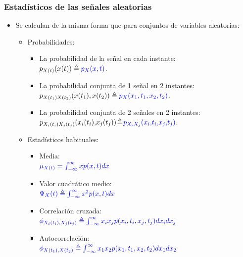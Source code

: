 \documentclass{beamer}
\numberwithin{section}{part}
\begin{document}
\begin{frame}
  \frametitle{Estadísticos de las señales aleatorias}
  \vspace{-0.2cm}
  \footnotesize
  \begin{itemize}
    \item Se calculan de la misma forma que para conjuntos de variables aleatorias:
    \begin{itemize}
      \footnotesize
      \item Probabilidades:
      \begin{itemize}
        \scriptsize
        \item La probabilidad de la señal en cada instante: \\$p_{X(t)}(x(t))\triangleq \color{blue}p_X(x,t)$.
        \item La probabilidad conjunta de 1 señal en 2 instantes:\\$p_{X(t_1)X(t_2)}(x(t_1),x(t_2))\triangleq \color{blue}p_X(x_1,t_1,x_2,t_2)$.\\
        \item La probabilidad conjunta de 2 señales en 2 instantes:\\$p_{X_i(t_i)X_j(t_j)}(x_i(t_i),\!x_j(t_j))\!\triangleq \color{blue}\! p_{X_iX_j}(x_i,\!t_i,\!x_j,\!t_j)$.
      \end{itemize}

      \item Estadísticos habituales:

      \begin{itemize}
        \scriptsize
        \item Media:\\$\color{blue}\mu_{X(t)}=\int_{-\infty}^\infty xp(x,t)dx$\\
        \item Valor cuadrático medio:\\$\color{blue}\Psi_X(t)\triangleq \int_{-\infty}^\infty x^2p(x,t)dx$\\
        \item Correlación cruzada:\\$\color{blue}\phi_{X_i(t_i),X_j(t_j)} \triangleq\int_{-\infty}^\infty x_ix_jp(x_i,t_i,x_j,t_j)dx_idx_j$\\
        \item Autocorrelación:\\$\color{blue}\phi_{X(t_1),X(t_2)}\triangleq\int_{-\infty}^\infty x_1x_2p(x_1,t_1,x_2,t_2)dx_1dx_2$
      \end{itemize}
    \end{itemize}
  \end{itemize}



\end{frame}
\end{document}
